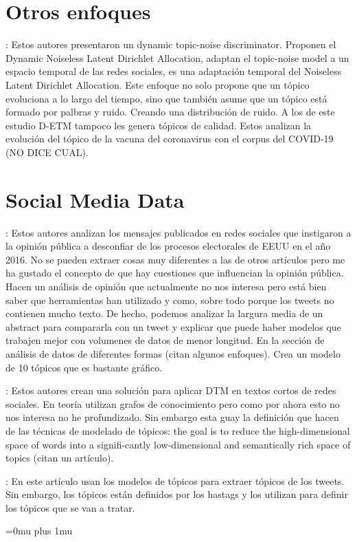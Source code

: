 \documentclass[a4paper,10pt]{article}
\begin{document}
\section{Otros enfoques}
\cite{Churchill2022}: Estos autores presentaron un dynamic topic-noise discriminator. Proponen el Dynamic Noiseless Latent Dirichlet Allocation, adaptan el topic-noise model a un espacio temporal de las redes sociales, es una adaptación temporal del Noiseless Latent Dirichlet Allocation. Este enfoque no solo propone que un tópico evoluciona a lo largo del tiempo, sino que también asume que un tópico está formado por palbras y ruido. Creando una distribución de ruido. A los de este estudio D-ETM tampoco les genera tópicos de calidad. Estos analizan la evolución del tópico de la vacuna del coronavirus con el corpus del COVID-19 (NO DICE CUAL).


\section{Social Media Data}
\cite{Golino2022}: Estos autores analizan los mensajes publicados en redes sociales que instigaron a la opinión pública a desconfiar de los procesos electorales de EEUU en el año 2016. No se pueden extraer cosas muy diferentes a las de otros artículos pero me ha gustado el concepto de que hay cuestiones que influencian la opinión pública. Hacen un análisis de opinión que actualmente no nos interesa pero está bien saber que herramientas han utilizado y como, sobre todo porque los tweets no contienen mucho texto. De hecho, podemos analizar la largura media de un abstract para compararla con un tweet y explicar que puede haber modelos que trabajen mejor con volumenes de datos de menor longitud. En la sección de análisis de datos de diferentes formas (citan algunos enfoques). Crea un modelo de 10 tópicos que es bastante gráfico.

\cite{Ghoorchian2020}: Estos autores crean una solución para aplicar DTM en textos cortos de redes sociales. En teoría utilizan grafos de conocimiento pero como por ahora esto no nos interesa no he profundizado. Sin embargo esta guay la definición que hacen de las técnicas de modelado de tópicos: the goal is to reduce the high-dimensional space of words into a signifi-cantly low-dimensional and semantically rich space of topics (citan un artículo).


\cite{Tabassum2021}: En este artículo usan los modelos de tópicos para extraer tópicos de los tweets. Sin embargo, los tópicos están definidos por los hastags y los utilizan para definir los tópicos que se van a tratar.






\Urlmuskip=0mu plus 1mu

\end{document}
